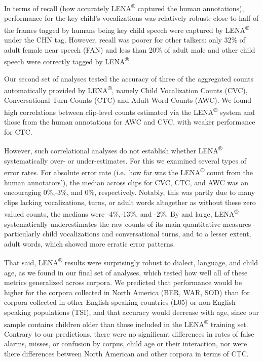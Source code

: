 \documentclass[english,table,man,floatsintext]{apa6}
\begin{document}
In terms of recall (how accurately LENA\textsuperscript{®} captured the
human annotations), performance for the key child's vocalizations was
relatively robust; close to half of the frames tagged by humans being
key child speech were captured by LENA\textsuperscript{®} under the CHN
tag. However, recall was poorer for other talkers: only 32\% of adult
female near speech (FAN) and less than 20\% of adult male and other
child speech were correctly tagged by LENA\textsuperscript{®}.

Our second set of analyses tested the accuracy of three of the
aggregated counts automatically provided by LENA\textsuperscript{®},
namely Child Vocalization Counts (CVC), Conversational Turn Counts (CTC)
and Adult Word Counts (AWC). We found high correlations between
clip-level counts estimated via the LENA\textsuperscript{®} system and
those from the human annotations for AWC and CVC, with weaker
performance for CTC.

However, such correlational analyses do not establish whether
LENA\textsuperscript{®} systematically over- or under-estimates. For
this we examined several types of error rates. For absolute error rate
(i.e.~how far was the LENA\textsuperscript{®} count from the human
annotators'), the median across clips for CVC, CTC, and AWC was an
encouraging 0\%,-3\%, and 0\%, respectively. Notably, this was partly
due to many clips lacking vocalizations, turns, or adult words
altogether as without these zero valued counts, the medians were
-4\%,-13\%, and -2\%. By and large, LENA\textsuperscript{®}
systematically underestimates the raw counts of its main quantitative
measures - particularly child vocalizations and conversational turns,
and to a lesser extent, adult words, which showed more erratic error
patterns.

That said, LENA\textsuperscript{®} results were surprisingly robust to
dialect, language, and child age, as we found in our final set of
analyses, which tested how well all of these metrics generalized across
corpora. We predicted that performance would be higher for the corpora
collected in North America (BER, WAR, SOD) than for corpora collected in
other English-speaking countries (L05) or non-English speaking
populations (TSI), and that accuracy would decrease with age, since our
sample contains children older than those included in the
LENA\textsuperscript{®} training set. Contrary to our predictions, there
were no significant differences in rates of false alarms, misses, or
confusion by corpus, child age or their interaction, nor were there
differences between North American and other corpora in terms of CTC.
\end{document}
